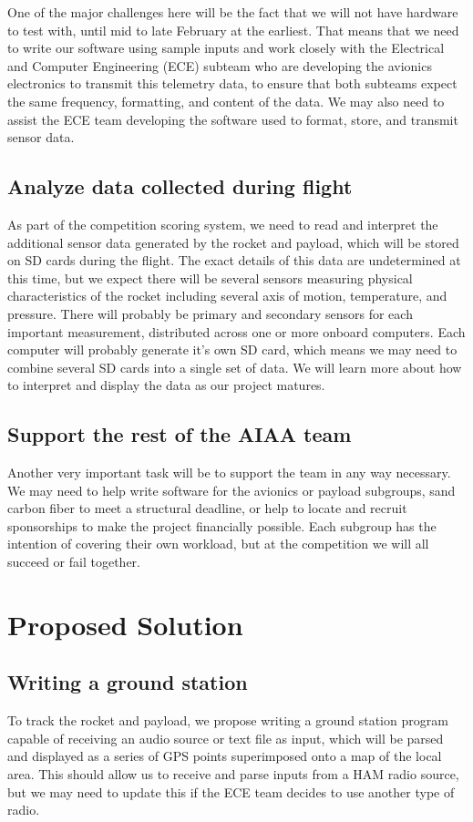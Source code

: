 \documentclass[onecolumn, draftclsnofoot,10pt, compsoc]{IEEEtran}
\begin{document}
One of the major challenges here will be the fact that we will not have hardware to test with, until mid to late February at the earliest.  That means that we need to write our software using sample inputs and work closely with the Electrical and Computer Engineering (ECE) subteam who are developing the avionics electronics to transmit this telemetry data, to ensure that both subteams expect the same frequency, formatting, and content of the data.  We may also need to assist the ECE team developing the software used to format, store, and transmit sensor data.

\subsection{Analyze data collected during flight}
As part of the competition scoring system, we need to read and interpret the additional sensor data generated by the rocket and payload, which will be stored on SD cards during the flight.  The exact details of this data are undetermined at this time, but we expect there will be several sensors measuring physical characteristics of the rocket including several axis of motion, temperature, and pressure.  There will probably be primary and secondary sensors for each important measurement, distributed across one or more onboard computers.  Each computer will probably generate it's own SD card, which means we may need to combine several SD cards into a single set of data.  We will learn more about how to interpret and display the data as our project matures.

\subsection{Support the rest of the AIAA team}
Another very important task will be to support the team in any way necessary.  We may need to help write software for the avionics or payload subgroups, sand carbon fiber to meet a structural deadline, or help to locate and recruit sponsorships to make the project financially possible.  Each subgroup has the intention of covering their own workload, but at the competition we will all succeed or fail together.

\section{Proposed Solution}

\subsection{Writing a ground station}
To track the rocket and payload, we propose writing a ground station program capable of receiving an audio source or text file as input, which will be parsed and displayed as a series of GPS points superimposed onto a map of the local area.  This should allow us to receive and parse inputs from a HAM radio source, but we may need to update this if the ECE team decides to use another type of radio.
\end{document}
